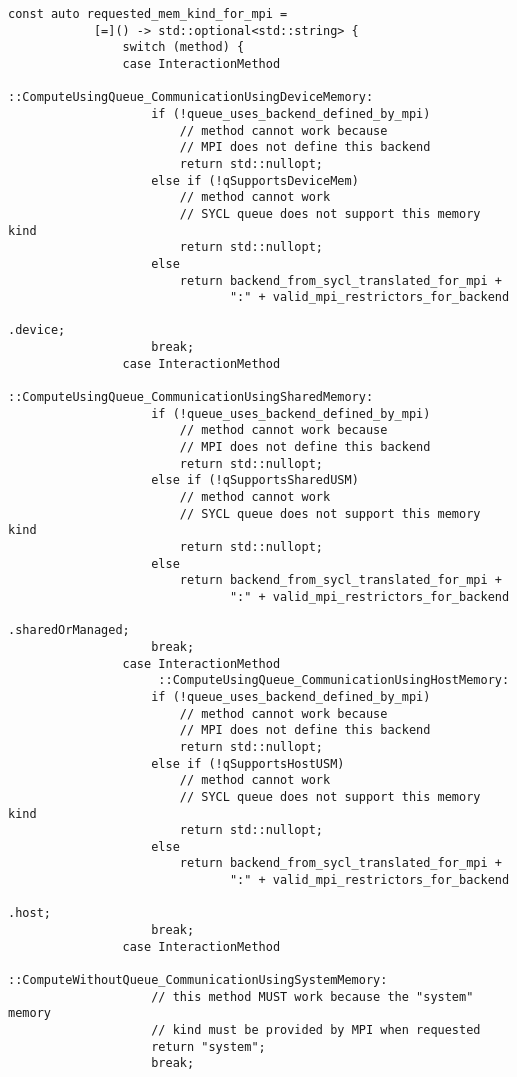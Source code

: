 \begin{example}
\begin{lstlisting}[language={[MPI]C++}]
            const auto requested_mem_kind_for_mpi =
            [=]() -> std::optional<std::string> {
                switch (method) {
                case InteractionMethod
                     ::ComputeUsingQueue_CommunicationUsingDeviceMemory:
                    if (!queue_uses_backend_defined_by_mpi)
                        // method cannot work because
                        // MPI does not define this backend
                        return std::nullopt;
                    else if (!qSupportsDeviceMem)
                        // method cannot work
                        // SYCL queue does not support this memory kind
                        return std::nullopt;
                    else
                        return backend_from_sycl_translated_for_mpi +
                               ":" + valid_mpi_restrictors_for_backend
                                                                .device;
                    break;
                case InteractionMethod
                     ::ComputeUsingQueue_CommunicationUsingSharedMemory:
                    if (!queue_uses_backend_defined_by_mpi)
                        // method cannot work because
                        // MPI does not define this backend
                        return std::nullopt;
                    else if (!qSupportsSharedUSM)
                        // method cannot work
                        // SYCL queue does not support this memory kind
                        return std::nullopt;
                    else
                        return backend_from_sycl_translated_for_mpi +
                               ":" + valid_mpi_restrictors_for_backend
                                                       .sharedOrManaged;
                    break;
                case InteractionMethod
                     ::ComputeUsingQueue_CommunicationUsingHostMemory:
                    if (!queue_uses_backend_defined_by_mpi)
                        // method cannot work because
                        // MPI does not define this backend
                        return std::nullopt;
                    else if (!qSupportsHostUSM)
                        // method cannot work
                        // SYCL queue does not support this memory kind
                        return std::nullopt;
                    else
                        return backend_from_sycl_translated_for_mpi +
                               ":" + valid_mpi_restrictors_for_backend
                                                                  .host;
                    break;
                case InteractionMethod
                   ::ComputeWithoutQueue_CommunicationUsingSystemMemory:
                    // this method MUST work because the "system" memory
                    // kind must be provided by MPI when requested
                    return "system";
                    break;


\end{lstlisting}
\end{example}
